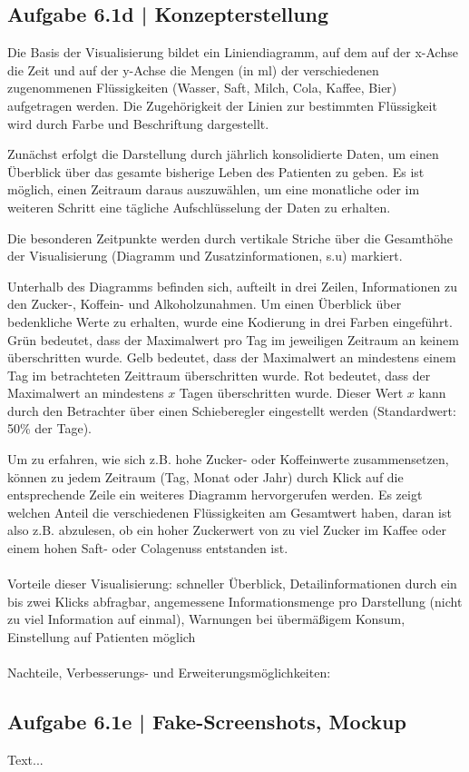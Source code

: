 \documentclass[a4paper,12pt,ngerman]{scrartcl}
\begin{document}
\subsection{Aufgabe 6.1d | Konzepterstellung}
Die Basis der Visualisierung bildet ein Liniendiagramm, auf dem auf der x-Achse die Zeit und auf der y-Achse die Mengen (in ml) der verschiedenen zugenommenen Flüssigkeiten (Wasser, Saft, Milch, Cola, Kaffee, Bier) aufgetragen werden. Die Zugehörigkeit der Linien zur bestimmten Flüssigkeit wird durch Farbe und Beschriftung dargestellt.

Zunächst erfolgt die Darstellung durch jährlich konsolidierte Daten, um einen Überblick über das gesamte bisherige Leben des Patienten zu geben. Es ist möglich, einen Zeitraum daraus auszuwählen, um eine monatliche oder im weiteren Schritt eine tägliche Aufschlüsselung der Daten zu erhalten.

Die besonderen Zeitpunkte werden durch vertikale Striche über die Gesamthöhe der Visualisierung (Diagramm und Zusatzinformationen, s.u) markiert.

Unterhalb des Diagramms befinden sich, aufteilt in drei Zeilen, Informationen zu den Zucker-, Koffein- und Alkoholzunahmen. Um einen Überblick über bedenkliche Werte zu erhalten, wurde eine Kodierung in drei Farben eingeführt. Grün bedeutet, dass der Maximalwert pro Tag im jeweiligen Zeitraum an keinem überschritten wurde. Gelb bedeutet, dass der Maximalwert an mindestens einem Tag im betrachteten Zeittraum überschritten wurde. Rot bedeutet, dass der Maximalwert an mindestens $x$ Tagen überschritten wurde. Dieser Wert $x$ kann durch den Betrachter über einen Schieberegler eingestellt werden (Standardwert: 50\% der Tage).

Um zu erfahren, wie sich z.B. hohe Zucker- oder Koffeinwerte zusammensetzen, können zu jedem Zeitraum (Tag, Monat oder Jahr) durch Klick auf die entsprechende Zeile ein weiteres Diagramm hervorgerufen werden. Es zeigt welchen Anteil die verschiedenen Flüssigkeiten am Gesamtwert haben, daran ist also z.B. abzulesen, ob ein hoher Zuckerwert von zu viel Zucker im Kaffee oder einem hohen Saft- oder Colagenuss entstanden ist.
\\\\
Vorteile dieser Visualisierung: schneller Überblick, Detailinformationen durch ein bis zwei Klicks abfragbar, angemessene Informationsmenge pro Darstellung (nicht zu viel Information auf einmal), Warnungen bei übermäßigem Konsum, Einstellung auf Patienten möglich
\\\\
Nachteile, Verbesserungs- und Erweiterungsmöglichkeiten:

\subsection{Aufgabe 6.1e | Fake-Screenshots, Mockup}
Text...
\end{document}
